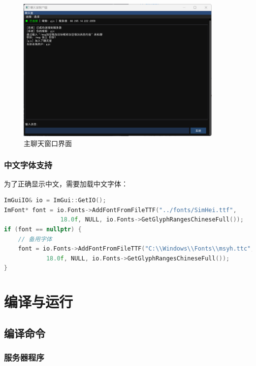 \documentclass[12pt, a4paper]{article}
\begin{document}
\begin{figure}[H]
   \centering
   \includegraphics[width=0.9\textwidth]{pic/chat_window.png}
   \caption{主聊天窗口界面}
   \label{fig:chat_window}
\end{figure}

\subsubsection{中文字体支持}

为了正确显示中文，需要加载中文字体：

\begin{lstlisting}[language=c++]
ImGuiIO& io = ImGui::GetIO();
ImFont* font = io.Fonts->AddFontFromFileTTF("../fonts/SimHei.ttf", 
                18.0f, NULL, io.Fonts->GetGlyphRangesChineseFull());
if (font == nullptr) {
    // 备用字体
    font = io.Fonts->AddFontFromFileTTF("C:\\Windows\\Fonts\\msyh.ttc", 
            18.0f, NULL, io.Fonts->GetGlyphRangesChineseFull());
}
\end{lstlisting}

\section{编译与运行}

\subsection{编译命令}

\subsubsection{服务器程序}
\end{document}

